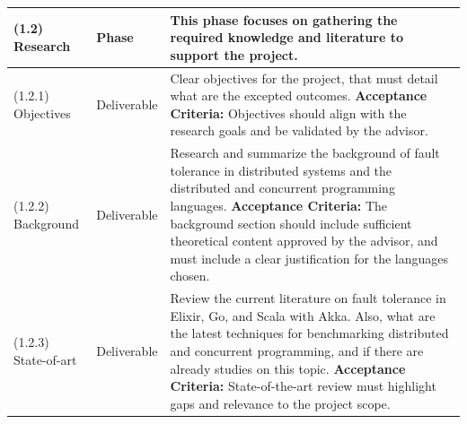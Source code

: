 \begin{longtable}{|p{3cm}|p{2.5cm}|p{8cm}|}
    (1.2) Research                 & Phase                 & This phase focuses on gathering the required knowledge and literature to support the project.                                                                                                                                                                                                                                                             \\ \hline
    (1.2.1) Objectives             & Deliverable           & Clear objectives for the project, that must detail what are the excepted outcomes. \newline \textbf{Acceptance Criteria:} Objectives should align with the research goals and be validated by the advisor.                                                                                                                                                \\ \hline
    (1.2.2) Background             & Deliverable           & Research and summarize the background of fault tolerance in distributed systems and the distributed and concurrent programming languages.  \newline \textbf{Acceptance Criteria:} The background section should include sufficient theoretical content approved by the advisor, and must include a clear justification for the languages chosen.          \\ \hline
    (1.2.3) State-of-art           & Deliverable           & Review the current literature on fault tolerance in Elixir, Go, and Scala with Akka. Also, what are the latest techniques for benchmarking distributed and concurrent programming, and if there are already studies on this topic. \newline \textbf{Acceptance Criteria:} State-of-the-art review must highlight gaps and relevance to the project scope. \\ \hline
    \hline 


\end{longtable}
